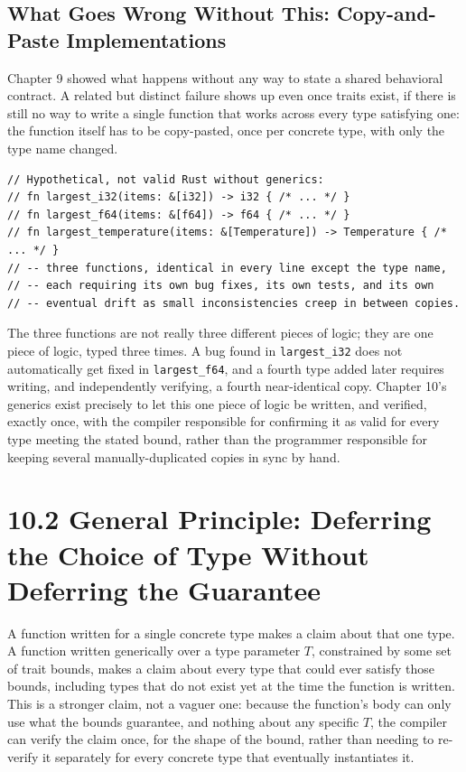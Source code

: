 \documentclass[11pt]{book}
\begin{document}
\subsection*{What Goes Wrong Without This: Copy-and-Paste Implementations}

Chapter 9 showed what happens without any way to state a shared behavioral contract. A related but distinct failure shows up even once traits exist, if there is still no way to write a single function that works across every type satisfying one: the function itself has to be copy-pasted, once per concrete type, with only the type name changed.

\begin{lstlisting}
// Hypothetical, not valid Rust without generics:
// fn largest_i32(items: &[i32]) -> i32 { /* ... */ }
// fn largest_f64(items: &[f64]) -> f64 { /* ... */ }
// fn largest_temperature(items: &[Temperature]) -> Temperature { /* ... */ }
// -- three functions, identical in every line except the type name,
// -- each requiring its own bug fixes, its own tests, and its own
// -- eventual drift as small inconsistencies creep in between copies.
\end{lstlisting}

The three functions are not really three different pieces of logic; they are one piece of logic, typed three times. A bug found in \texttt{largest\_i32} does not automatically get fixed in \texttt{largest\_f64}, and a fourth type added later requires writing, and independently verifying, a fourth near-identical copy. Chapter 10's generics exist precisely to let this one piece of logic be written, and verified, exactly once, with the compiler responsible for confirming it as valid for every type meeting the stated bound, rather than the programmer responsible for keeping several manually-duplicated copies in sync by hand.

\section*{10.2 General Principle: Deferring the Choice of Type Without Deferring the Guarantee}

A function written for a single concrete type makes a claim about that one type. A function written generically over a type parameter $T$, constrained by some set of trait bounds, makes a claim about every type that could ever satisfy those bounds, including types that do not exist yet at the time the function is written. This is a stronger claim, not a vaguer one: because the function's body can only use what the bounds guarantee, and nothing about any specific $T$, the compiler can verify the claim once, for the shape of the bound, rather than needing to re-verify it separately for every concrete type that eventually instantiates it.
\end{document}

